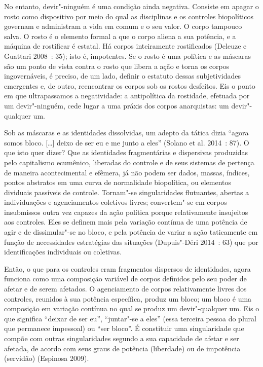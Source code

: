 No entanto, devir"-ninguém é uma condição ainda
negativa. Consiste em apagar o rosto como dispositivo por meio do qual
as disciplinas e os controles biopolíticos governam e administram a vida
em comum e o seu valor. O corpo tampouco salva. O rosto é o elemento
formal a que o corpo aliena a sua potência, e a máquina de rostificar é
estatal. Há corpos inteiramente rostificados (Deleuze e Guattari 2008~: 35);
isto é, impotentes. Se o rosto é uma política e as máscaras são
um ponto de vista contra o rosto que libera a ação e torna os corpos
ingovernáveis, é preciso, de um lado, definir o estatuto dessas
subjetividades emergentes e, de outro, reencontrar os corpos sob os
rostos desfeitos. Eis o ponto em que ultrapassamos a negatividade: a
antipolítica da rostidade, efetuada por um devir"-ninguém, cede lugar a
uma práxis dos corpos anarquistas: um devir"-qualquer um.

Sob as máscaras e as identidades dissolvidas, um adepto da tática dizia
``agora somos bloco. {[}\ldots{}{]} deixo de ser eu e me junto
a eles'' (Solano et al. 2014~: 87). O que isto quer dizer? Que as
identidades fragmentárias e dispersivas produzidas pelo capitalismo
ecumênico, liberadas do controle e de seus sistemas de pertença de
maneira acontecimental e efêmera, já não podem ser dados, massas,
índices, pontos abstratos em uma curva de normalidade biopolítica, ou
elementos dividuais passíveis de controle. Tornam"-se singularidades
flutuantes, abertas a individuações e agenciamentos coletivos livres;
convertem"-se em corpos insubmissos outra vez capazes da ação política
porque relativamente insujeitos aos controles. Eles se definem mais pela
variação contínua de uma potência de agir e de dissimular"-se no bloco, e
pela potência de variar a ação taticamente em função de necessidades
estratégias das situações (Dupuis"-Déri 2014~: 63) que por identificações
individuais ou coletivas.

Então, o que para os controles eram fragmentos dispersos de identidades,
agora funciona como uma composição variável de corpos definidos pelo seu
poder de afetar e de serem afetados. O agenciamento de corpos
relativamente livres dos controles, reunidos à sua potência específica,
produz um bloco; um bloco é uma composição em variação contínua no qual
se produz um devir"-qualquer um. Eis o que significa ``deixar de ser
eu'', ``juntar"-se a eles'' (essa terceira pessoa do plural que permanece
impessoal) ou ``ser bloco''. É constituir uma singularidade que compõe
com outras singularidades segundo a sua capacidade de afetar e ser
afetada, de acordo com seus graus de potência (liberdade) ou de
impotência (servidão) (Espinosa 2009).

